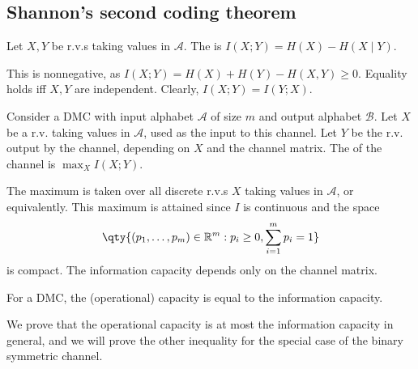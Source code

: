 \subsection{Shannon's second coding theorem}
\begin{definition}
    Let $X, Y$ be r.v.s taking values in $\mathcal A$.
    The  is $I(X;Y) = H(X) - H(X \mid Y)$.
\end{definition}

This is nonnegative, as $I(X;Y) = H(X) + H(Y) - H(X,Y) \geq 0$.
Equality holds iff $X, Y$ are independent.
Clearly, $I(X;Y) = I(Y;X)$.

\begin{definition}
    Consider a DMC with input alphabet $\mathcal A$ of size $m$ and output alphabet $\mathcal B$.
    Let $X$ be a r.v. taking values in $\mathcal A$, used as the input to this channel.
    Let $Y$ be the r.v. output by the channel, depending on $X$ and the channel matrix.
    The  of the channel is $\max_{X} I(X;Y)$.
\end{definition}

The maximum is taken over all discrete r.v.s $X$ taking values in $\mathcal A$, or equivalently.
This maximum is attained since $I$ is continuous and the space
\begin{align*}
        \qty{(p_1, \dots, p_m) \in \mathbb R^m : p_i \geq 0, \sum_{i=1}^m p_i = 1}
    \end{align*}
is compact.
The information capacity depends only on the channel matrix.

\begin{theorem}
    For a DMC, the (operational) capacity is equal to the information capacity.
\end{theorem}

We prove that the operational capacity is at most the information capacity in general, and we will prove the other inequality for the special case of the binary symmetric channel.

